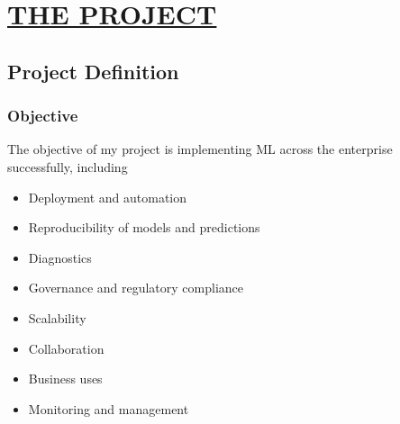\documentclass[12pt,oneside,a4paper]{report}
\begin{document}
\chapter{\underline{THE PROJECT}}
\section{Project Definition}
\subsection{Objective}
\fontsize{12pt}{10pt}\selectfont
The objective of my project is implementing ML across the enterprise successfully, including
\begin{itemize}
\item    Deployment and automation
\item    Reproducibility of models and predictions
\item    Diagnostics
\item    Governance and regulatory compliance
\item    Scalability
\item    Collaboration
\item    Business uses
\item    Monitoring and management
\end{itemize}
\end{document}
